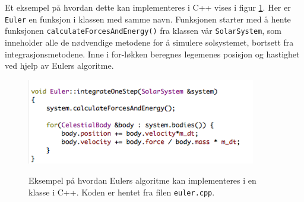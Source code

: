 \documentclass[11pt,a4paper]{article}
\begin{document}
Et eksempel på hvordan dette kan implementeres i C++ vises i figur \ref{euler}. Her er \texttt{Euler} en funksjon i klassen med samme navn. Funksjonen starter med å hente funksjonen \texttt{calculateForcesAndEnergy()} fra klassen vår \texttt{SolarSystem}, som inneholder alle de nødvendige metodene for å simulere solsystemet, bortsett fra integrasjonsmetodene. Inne i for-løkken beregnes legemenes posisjon og hastighet ved hjelp av Eulers algoritme.

\FloatBarrier
\begin{figure}[!ht]
\begin{center}
  \includegraphics[width = 100mm]{euler.png}\\
  \caption{Eksempel på hvordan Eulers algoritme kan implementeres i en klasse i C++. Koden er hentet fra filen \texttt{euler.cpp}.}   \label{euler}
  \end{center}
  \end{figure}
\FloatBarrier
\end{document}
